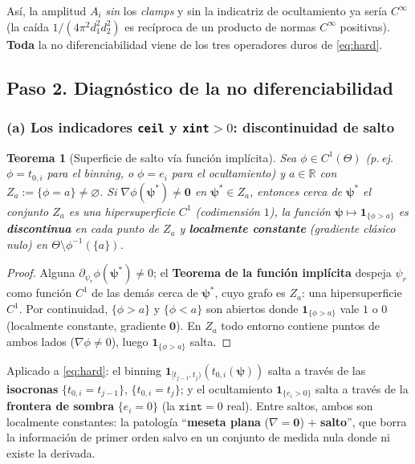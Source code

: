 \documentclass[11pt,a4paper]{article}
\theoremstyle{plain}
\newtheorem{theorem}{Teorema}
\theoremstyle{definition}
\newcommand{\vect}[1]{\boldsymbol{#1}}
\newcommand{\R}{\mathbb{R}}
\begin{document}
As\'i, la amplitud $A_i$ \emph{sin} los \emph{clamps} y sin la indicatriz de
ocultamiento ya ser\'ia $C^\infty$ (la ca\'ida $1/(4\pi^2 d_1^2 d_2^2)$ es
rec\'iproca de un producto de normas $C^\infty$ positivas). \textbf{Toda} la no
diferenciabilidad viene de los tres operadores duros de \eqref{eq:hard}.

\subsection*{Paso 2. Diagn\'ostico de la no diferenciabilidad}
\label{sec:diagnostico}

\subsubsection*{(a) Los indicadores \texttt{ceil} y \texttt{xint}$>0$: discontinuidad de salto}

\begin{theorem}[Superficie de salto v\'ia funci\'on impl\'icita]\label{thm:ift}
Sea $\phi\in C^1(\Theta)$ (p.\,ej.\ $\phi=t_{0,i}$ para el binning, o
$\phi=e_i$ para el ocultamiento) y $a\in\R$ con
$Z_a:=\{\phi=a\}\neq\varnothing$. Si $\nabla\phi(\vect{\psi}^\ast)\neq\vect 0$ en
$\vect{\psi}^\ast\in Z_a$, entonces cerca de $\vect{\psi}^\ast$ el conjunto $Z_a$
es una hipersuperficie $C^1$ (codimensi\'on $1$), la funci\'on
$\vect{\psi}\mapsto\mathbf{1}_{\{\phi>a\}}$ es \textbf{discontinua} en cada punto
de $Z_a$ y \textbf{localmente constante} (gradiente cl\'asico nulo) en
$\Theta\setminus\phi^{-1}(\{a\})$.
\end{theorem}
\begin{proof}
Alguna $\partial_{\psi_r}\phi(\vect{\psi}^\ast)\neq0$; el \textbf{Teorema de la
funci\'on impl\'icita} despeja $\psi_r$ como funci\'on $C^1$ de las dem\'as cerca de
$\vect{\psi}^\ast$, cuyo grafo es $Z_a$: una hipersuperficie $C^1$. Por
continuidad, $\{\phi>a\}$ y $\{\phi<a\}$ son abiertos donde
$\mathbf 1_{\{\phi>a\}}$ vale $1$ o $0$ (localmente constante, gradiente $\vect
0$). En $Z_a$ todo entorno contiene puntos de ambos lados ($\nabla\phi\neq0$),
luego $\mathbf 1_{\{\phi>a\}}$ salta.
\end{proof}

Aplicado a \eqref{eq:hard}: el binning $\mathbf
1_{[t_{j-1},t_j)}(t_{0,i}(\vect{\psi}))$ salta a trav\'es de las
\textbf{isocronas} $\{t_{0,i}=t_{j-1}\}$, $\{t_{0,i}=t_j\}$; y el ocultamiento
$\mathbf 1_{\{e_i>0\}}$ salta a trav\'es de la \textbf{frontera de sombra}
$\{e_i=0\}$ (la $\texttt{xint}=0$ real). Entre saltos, ambos son localmente
constantes: la patolog\'ia ``\textbf{meseta plana} ($\nabla=\vect0$) $+$
\textbf{salto}'', que borra la informaci\'on de primer orden salvo en un conjunto
de medida nula donde ni existe la derivada.
\end{document}

